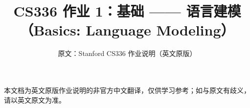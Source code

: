 \documentclass[11pt,a4paper]{ctexart}
\title{\textbf{CS336 作业 1：基础 —— 语言建模（Basics: Language Modeling）}}
\author{原文：Stanford CS336 作业说明（英文原版）}
\date{}
\begin{document}
\maketitle
\begin{center}\small
本文档为英文原版作业说明的非官方中文翻译，仅供学习参考；如与原文有歧义，请以英文原文为准。
\end{center}
\tableofcontents
\clearpage



\end{document}

